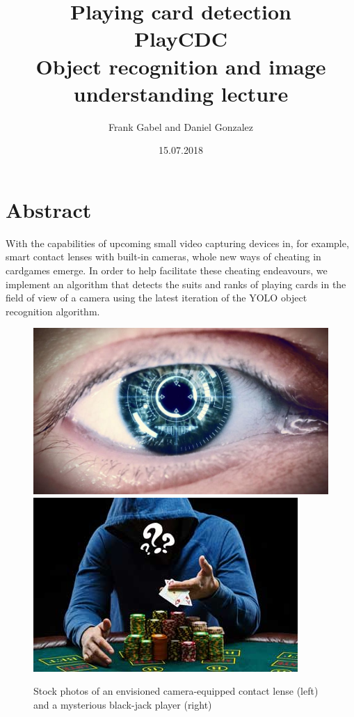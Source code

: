 \documentclass[a4paper]{article}
\title{\textbf{Playing card detection}\\ PlayCDC\\Object recognition and image understanding lecture}
\author{Frank Gabel and Daniel Gonzalez}
\date{15.07.2018}
\begin{document}
\maketitle
\section{Abstract}
With the capabilities of upcoming small video capturing devices in, for example, smart contact lenses with built-in cameras, whole new ways of cheating in cardgames emerge. In order to help facilitate these cheating endeavours, we implement an algorithm that detects the suits and ranks of playing cards in the field of view of a camera using the latest iteration of the YOLO object recognition algorithm.
\begin{figure}[h]
\includegraphics[scale=0.25]{contact_lense}
\includegraphics[scale=0.532]{poker_player}
\caption{Stock photos of an envisioned camera-equipped contact lense (left) and a mysterious black-jack player (right)}
\end{figure}
\end{document}
